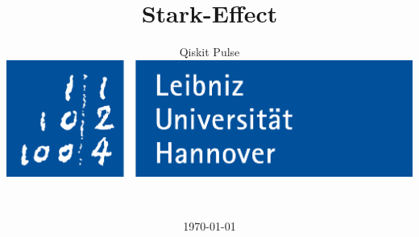 \title{
Stark-Effect
}
\subtitle{Qiskit Pulse %
\vspace{1cm}\\
 \includegraphics[width=.75\linewidth]{IMAGE/luh_logo.png}}
\author{
\authA\\
\matA
}
\date{\today}

\pagestyle{empty} %
\setcounter{page}{0} %
\maketitle %

\newpage
